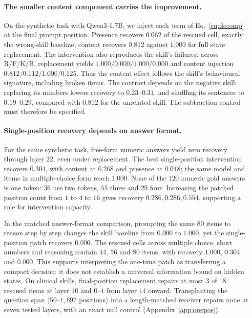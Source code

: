 \documentclass{article}
\begin{document}
\paragraph{The smaller content component carries the improvement.}
On the synthetic task with Qwen3-1.7B, we inject each term of
Eq.~\ref{eq:decomp} at the final prompt position. Presence recovers $0.062$ of
the rescued cell, exactly the wrong-skill baseline; content recovers $0.812$
against $1.000$ for full state replacement. The intervention also reproduces
the skill's failures: across R/F/K/B, replacement yields
$1.000/0.000/1.000/0.000$ and content injection
$0.812/0.112/1.000/0.125$. Thus the content effect follows the skill's
behavioural signature, including broken items. The contrast depends on the
negative skill: replacing its numbers lowers recovery to $0.23$--$0.31$, and
shuffling its sentences to $0.19$--$0.29$, compared with $0.812$ for the unrelated
skill. The subtraction control must therefore be specified.

\paragraph{Single-position recovery depends on answer format.}
\label{sec:onepos}
For the same synthetic task, free-form numeric answers yield zero recovery
through layer $22$, even under replacement. The best single-position intervention
recovers $0.304$, with content at $0.268$ and presence at $0.018$; the same model
and items in multiple-choice form reach $1.000$. None of the $120$ numeric gold
answers is one token: $36$ use two tokens, $55$ three and $29$ four. Increasing
the patched position count from $1$ to $4$ to $16$ gives recovery
$0.286,0.286,0.554$, supporting a role for intervention capacity.

In the matched answer-format comparison, prompting the same $80$ items to reason
step by step changes the skill baseline from $0.000$ to $1.000$, yet the
single-position patch recovers $0.000$. The rescued cells across multiple choice,
short numbers and reasoning contain $44$, $56$ and $80$ items, with recovery
$1.000$, $0.304$ and $0.000$. This supports interpreting the one-time patch as
transferring a compact decision; it does not establish a universal information
bound on hidden states. On clinical skills, final-position replacement repairs
at most $3$ of $18$ rescued items at layer $10$ and $0$--$1$ from layer $14$
onward. Transplanting the question span ($50$--$1{,}697$ positions) into a
length-matched receiver repairs none at seven tested layers, with an exact null
control (Appendix~\ref{app:onepos}).
\end{document}
